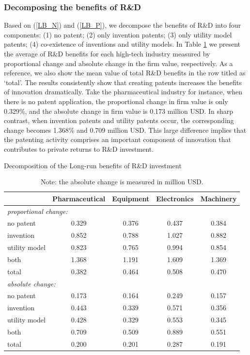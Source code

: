 \documentclass[11pt]{article}
\begin{document}
\subsubsection{Decomposing the benefits of R\&D} 
Based on (\ref{LB_N}) and (\ref{LB_P}), we decompose the benefits of R\&D into four components: (1) no patent; (2) only invention patents; (3) only utility model patents; (4) co-existence of inventions and utility models. In Table \ref{T17C} we present the average of R\&D benefits for each high-tech industry measured by proportional change and absolute change in the firm value, respectively. As a reference, we also show the mean value of total R\&D benefits in the row titled as `total'. The results consistently show that creating patents increases the benefits of innovation dramatically. Take the pharmaceutical industry for instance, when there is no patent application, the proportional change in firm value is only 0.329\%, and the absolute change in firm value is 0.173 million USD. In sharp contrast, when invention patents and utility patents occur, the corresponding change becomes 1.368\% and 0.709 million USD. This large difference implies that the patenting activity comprises an important component of innovation that contributes to private returns to R\&D investment.

\begin{table}[h] %
    \centering
    \caption{Decomposition of the Long-run benefits of R\&D investment}
    \label{T17C}
    \begin{tabular}{lcccc}
    \toprule
                  &Pharmaceutical & Equipment & Electronics & Machinery\\
    \hline
    \multicolumn{5}{l}{\textit{proportional change:}}                      \\
    no patent  & 0.329 & 0.376 & 0.437 & 0.384 \\
    invention  & 0.852 & 0.788 & 1.027 & 0.882 \\
    utility model   & 0.823 & 0.765 & 0.994 & 0.854 \\
    both       & 1.368 & 1.191 & 1.609 & 1.369 \\
    total      & 0.382 & 0.464 & 0.508 & 0.470  \\
    \hline
    \multicolumn{5}{l}{\textit{absolute change:}}                          \\
    no patent  & 0.173 & 0.164 & 0.249 & 0.157 \\
    invention  & 0.443 & 0.339 & 0.571 & 0.356 \\
    utility model  & 0.428 & 0.329 & 0.553 & 0.345 \\
    both       & 0.709 & 0.509 & 0.889 & 0.551 \\
    total      & 0.200 & 0.201 & 0.287 & 0.191 \\ 
    \bottomrule
    \end{tabular}
    \caption*{\small{}Note: the absolute change is measured in million USD.}{\small \par}
    \end{table}
\end{document}
